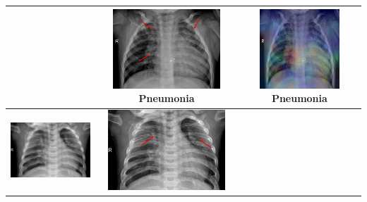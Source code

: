 \begin{longtable} { | c | c | c | }
\begin{minipage}{.3\textwidth}
    \vspace{0.5em}
    \end{minipage}
    &
  \begin{minipage}{.3\textwidth}
      \vspace{1em}
      \includegraphics[width=\linewidth, height=30mm]{Images/PneuRadio2.png}
           \centering  Pneumonia
               \vspace{0.5em}
    \end{minipage}
    & 
    \begin{minipage}{.3\textwidth}
        \vspace{1em}
      \includegraphics[width=\linewidth, height=30mm]{Images/PneuHeatmap2.jpg}
      \centering Pneumonia
          \vspace{0.5em}
    \end{minipage}
    \\ \hline
    \begin{minipage}{.3\textwidth}
    \vspace{1em}
      \includegraphics[width=\linewidth, height=30mm]{Images/PneuOrig3.jpg}
    \vspace{0.5em}
    \end{minipage}
    &
  \begin{minipage}{.3\textwidth}
      \vspace{1em}
      \includegraphics[width=\linewidth, height=30mm]{Images/PneuRadio3.png}

\end{minipage}
\end{longtable}
